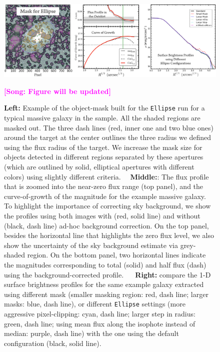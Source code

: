 \documentclass{emulateapj}
\newcommand{\song}[1]{\textcolor{magenta}{\textbf{[Song: #1]}}}
\begin{document}
\begin{CJK*}{UTF8}{gbsn}
    
    \begin{figure}[hbt!]
        \centering 
        \includegraphics[width=\textwidth]{fig/redbcg_ellipse_tech}
        \caption{\textbf{Left:} Example of the object-mask built for the \texttt{Ellipse}
            run for a typical massive galaxy in the sample. 
            All the shaded regions are masked out. 
            The three dash lines (red, inner one and two blue ones) around the target 
            at the center outlines the three radius we defined using the flux radius 
            of the target.  
            We increase the mask size for objects detected in different regions 
            separated by these apertures (which are outlined by solid, elliptical 
            apertures with different colors) using slightly different criteria.~~
            \textbf{Middle:}: The flux profile that is zoomed into the near-zero flux 
            range (top panel), and the curve-of-growth of the magnitude for the example
            massive galaxy.  
            To highlight the importance of correcting sky background, we show the profiles 
            using both images with (red, solid line) and without (black, dash line) 
            ad-hoc background correction. 
            On the top panel, besides the horizontal line that highlights the zero flux 
            level, we also show the uncertainty of the sky background estimate via 
            grey-shaded region.  
            On the bottom panel, two horizontal lines indicate the magnitudes 
            corresponding to total (solid) and half flux (dash) using the 
            background-corrected profile. ~~
            \textbf{Right:} compare the 1-D surface brightness profiles for the same 
            example galaxy extracted using different mask 
            (smaller masking region: red, dash line; larger masks: blue, dash line), 
            or different \texttt{Ellipse} settings
            (more aggressive pixel-clipping: cyan, dash line; 
             larger step in radius: green, dash line; 
             using mean flux along the isophote instead of median: purple, dash line)
            with the one using the default configuration (black, solid line).}
            \song{Figure will be updated}
        \label{figure:A1}
    \end{figure}


\end{CJK*}
\end{document}
